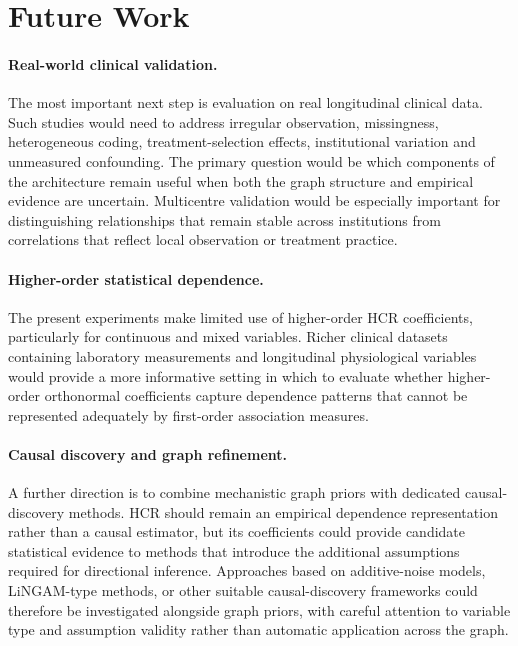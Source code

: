 \section{Future Work}
\label{sec:future-work}

\paragraph{Real-world clinical validation.}
The most important next step is evaluation on real longitudinal clinical data. Such studies
would need to address irregular observation, missingness, heterogeneous coding,
treatment-selection effects, institutional variation and unmeasured confounding. The
primary question would be which components of the architecture remain useful when both
the graph structure and empirical evidence are uncertain.
Multicentre validation would be especially important for distinguishing relationships that
remain stable across institutions from correlations that reflect local observation or treatment
practice.

\paragraph{Higher-order statistical dependence.}
The present experiments make limited use of higher-order HCR coefficients, particularly
for continuous and mixed variables. Richer clinical datasets containing laboratory
measurements and longitudinal physiological variables would provide a more informative
setting in which to evaluate whether higher-order orthonormal coefficients capture
dependence patterns that cannot be represented adequately by first-order association
measures.

\paragraph{Causal discovery and graph refinement.}
A further direction is to combine mechanistic graph priors with dedicated causal-discovery
methods. HCR should remain an empirical dependence representation rather than a causal
estimator, but its coefficients could provide candidate statistical evidence to methods that
introduce the additional assumptions required for directional inference. Approaches based
on additive-noise models, LiNGAM-type methods, or other suitable causal-discovery
frameworks could therefore be investigated alongside graph priors, with careful attention to
variable type and assumption validity rather than automatic application across the graph.

